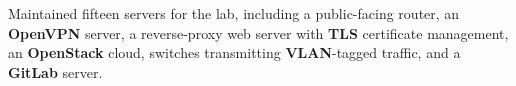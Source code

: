 \begin{rExperience}

        \item Maintained fifteen servers for the lab, including a public-facing router, an \textbf{OpenVPN} server, a
          reverse-proxy web server with \textbf{TLS} certificate management, an \textbf{OpenStack} cloud, switches
          transmitting \textbf{VLAN}-tagged traffic, and a \textbf{GitLab} server.


\end{rExperience}
